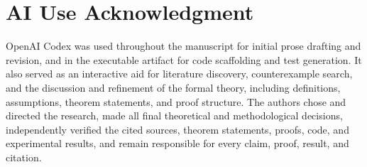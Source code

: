 \documentclass[conference]{IEEEtran}
\newif\ifarxiv
\begin{document}
\begin{abstract}
Our formal results cover Checkpoint and the six forms of Fork, Restore, and Merge, together with extensions, atomic enforcement, and the information every exact checker needs.
Lean mechanizes the finite checker and runtime invariant, and tests validate all six edit forms.
\ifarxiv
The source code, Lean proofs, and executable tests are available in the public GitHub repository at
\url{https://github.com/eunomia-bpf/agent-check-restore-safety}.
\fi
\end{abstract}













\clearpage
\appendices


\clearpage
\section*{AI Use Acknowledgment}
OpenAI Codex was used throughout the manuscript for initial prose drafting and revision, and in the executable artifact for code scaffolding and test generation.
It also served as an interactive aid for literature discovery, counterexample search, and the discussion and refinement of the formal theory, including definitions, assumptions, theorem statements, and proof structure.
The authors chose and directed the research, made all final theoretical and methodological decisions, independently verified the cited sources, theorem statements, proofs, code, and experimental results, and remain responsible for every claim, proof, result, and citation.



\end{document}
